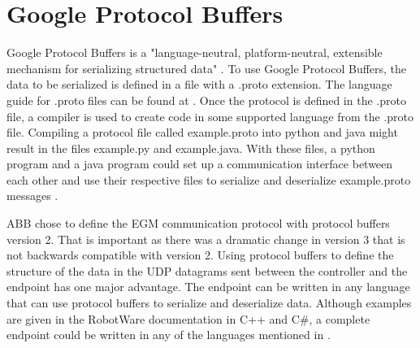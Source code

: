 \documentclass{cslthse-msc}
\begin{document}
\section{Google Protocol Buffers}
\label{sec:Tech_Back:GPB}
Google Protocol Buffers is a "language-neutral, platform-neutral, extensible mechanism for serializing structured data" \cite{Google:Proto_Start}. To use Google Protocol Buffers, the data to be serialized is defined in a file with a .proto extension. The language guide for .proto files can be found at \cite{Google:Proto_v2_guide}. Once the protocol is defined in the .proto file, a compiler is used to create code in some supported language from the .proto file. Compiling a protocol file called example.proto into python and java might result in the files example.py and example.java. With these files, a python program and a java program could set up a communication interface between each other and use their respective files to serialize and deserialize example.proto messages \cite{Google:Proto_Api}.\par

ABB chose to define the EGM communication protocol with protocol buffers version 2. That is important as there was a dramatic change in version 3 that is not backwards compatible with version 2. Using protocol buffers to define the structure of the data in the UDP datagrams sent between the controller and the endpoint has one major advantage. The endpoint can be written in any language that can use protocol buffers to serialize and deserialize data. Although examples are given in the RobotWare documentation in C++ and C\#, a complete endpoint could be written in any of the languages mentioned in \cite{Google:Proto_Other}.
\end{document}
